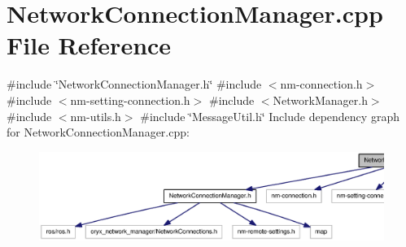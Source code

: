 \section{\-Network\-Connection\-Manager.\-cpp \-File \-Reference}
\label{NetworkConnectionManager_8cpp}
{\ttfamily \#include \char`\"{}\-Network\-Connection\-Manager.\-h\char`\"{}}\*
{\ttfamily \#include $<$nm-\/connection.\-h$>$}\*
{\ttfamily \#include $<$nm-\/setting-\/connection.\-h$>$}\*
{\ttfamily \#include $<$\-Network\-Manager.\-h$>$}\*
{\ttfamily \#include $<$nm-\/utils.\-h$>$}\*
{\ttfamily \#include \char`\"{}\-Message\-Util.\-h\char`\"{}}\*
\-Include dependency graph for \-Network\-Connection\-Manager.\-cpp\-:
\nopagebreak
\begin{figure}[H]
\begin{center}
\leavevmode
\includegraphics[width=350pt]{NetworkConnectionManager_8cpp__incl}
\end{center}
\end{figure}
